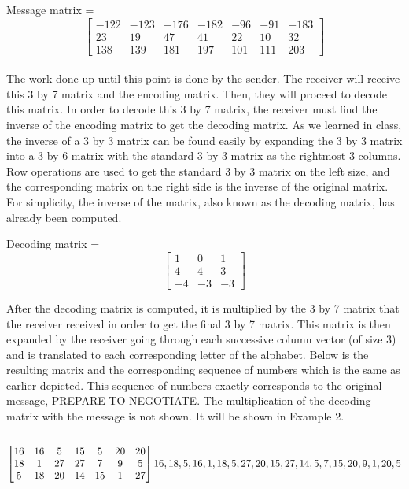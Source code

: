 \documentclass{article}
\begin{document}
{\center
Message matrix =
$$
\begin{bmatrix}
-122 & -123 & -176 & -182 & -96 & -91 & -183 \\
23 & 19 & 47 & 41 & 22 & 10 & 32 \\
138 & 139 & 181 & 197 & 101 & 111 & 203
\end{bmatrix}
$$
\endcenter}
\\
\noindent
The work done up until this point is done by the sender. The receiver will receive this 3 by 7 matrix and the encoding matrix. Then, they will proceed to decode this matrix. In order to decode this 3 by 7 matrix, the receiver must find the inverse of the encoding matrix to get the decoding matrix. As we learned in class, the inverse of a 3 by 3 matrix can be found easily by expanding the 3 by 3 matrix into a 3 by 6 matrix with the standard 3 by 3 matrix as the rightmost 3 columns. Row operations are used to get the standard 3 by 3 matrix on the left size, and the corresponding matrix on the right side is the inverse of the original matrix. For simplicity, the inverse of the matrix, also known as the decoding matrix, has already been computed.

{\center
Decoding matrix =
$$
\begin{bmatrix}
1 & 0 & 1 \\
4 & 4 & 3 \\
-4 & -3 & -3
\end{bmatrix}
$$
\endcenter}

\noindent
After the decoding matrix is computed, it is multiplied by the 3 by 7 matrix that the receiver received in order to get the final 3 by 7 matrix. This matrix is then expanded by the receiver going through each successive column vector (of size 3) and is translated to each corresponding letter of the alphabet. Below is the resulting matrix and the corresponding sequence of numbers which is the same as earlier depicted. This sequence of numbers exactly corresponds to the original message, PREPARE TO NEGOTIATE. The multiplication of the decoding matrix with the message is not shown. It will be shown in Example 2. \\
\\
{\center
$$
\begin{bmatrix}
16 & 16 & 5 & 15 & 5 & 20 & 20 \\
18 & 1 & 27 & 27 & 7 & 9 & 5 \\
5 & 18 & 20 & 14 & 15 & 1 & 27
\end{bmatrix} \\
16, 18, 5, 16, 1, 18, 5, 27, 20, 15, 27, 14, 5, 7, 15, 20, 9, 1, 20, 5
$$
\endcenter}
\end{document}
